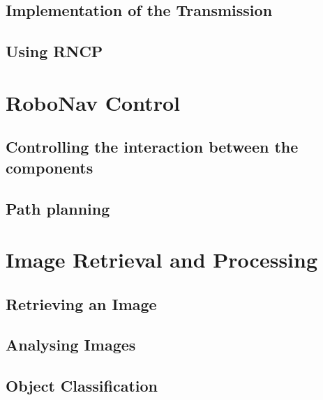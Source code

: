 \documentclass[12pt]{article}
\begin{document}
\newpage
\subsection{Implementation of the Transmission}
\label{subsec:impltransmission}
%

\subsection{Using RNCP}
\label{subsec:unsingrncp}
%

\newpage %
\section{RoboNav Control}
\label{sec:controlsoftware}
%

\subsection{Controlling the interaction between the components}
\label{subsec:interaction}
%

\newpage
\subsection{Path planning}
\label{subsec:pathplanning}
%

\newpage %
\section{Image Retrieval and Processing}
\label{sec:imageproc}
%

\subsection{Retrieving an Image}
\label{subsec:imgretrieving}
%

\subsection{Analysing Images}
\label{subsec:imganalysing}
%

\newpage
\subsection{Object Classification}
\label{subsec:imgclassification}
%
\end{document}
